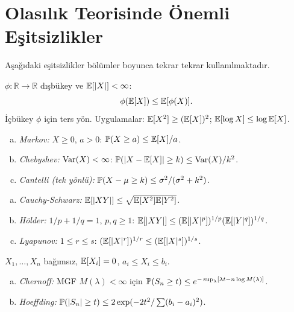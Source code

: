\section{Olasılık Teorisinde Önemli Eşitsizlikler}
\label{app:esitsizlikler}

Aşağıdaki eşitsizlikler bölümler boyunca tekrar tekrar kullanılmaktadır.

\begin{teorem}\label{app:thm:jensen}
$\phi:\mathbb{R}\to\mathbb{R}$ dışbükey ve $\mathbb{E}[|X|]<\infty$:
\[
  \phi(\mathbb{E}[X]) \leq \mathbb{E}[\phi(X)].
\]
İçbükey $\phi$ için ters yön.
Uygulamalar: $\mathbb{E}[X^2]\geq(\mathbb{E}[X])^2$; $\mathbb{E}[\log X]\leq\log\mathbb{E}[X]$.
\end{teorem}

\begin{teorem}\label{app:thm:markov_cheby}
\begin{enumerate}[(a)]
  \item \emph{Markov:} $X\geq0$, $a>0$: $\mathbb{P}(X\geq a)\leq\mathbb{E}[X]/a$.
  \item \emph{Chebyshev:} $\operatorname{Var}(X)<\infty$: $\mathbb{P}(|X-\mathbb{E}[X]|\geq k)\leq\operatorname{Var}(X)/k^2$.
  \item \emph{Cantelli (tek yönlü):} $\mathbb{P}(X-\mu\geq k)\leq\sigma^2/(\sigma^2+k^2)$.
\end{enumerate}
\end{teorem}

\begin{teorem}\label{app:thm:cs_holder}
\begin{enumerate}[(a)]
  \item \emph{Cauchy-Schwarz:} $\mathbb{E}[|XY|]\leq\sqrt{\mathbb{E}[X^2]\mathbb{E}[Y^2]}$.
  \item \emph{Hölder:} $1/p+1/q=1$, $p,q\geq1$: $\mathbb{E}[|XY|]\leq(\mathbb{E}[|X|^p])^{1/p}(\mathbb{E}[|Y|^q])^{1/q}$.
  \item \emph{Lyapunov:} $1\leq r\leq s$: $(\mathbb{E}[|X|^r])^{1/r}\leq(\mathbb{E}[|X|^s])^{1/s}$.
\end{enumerate}
\end{teorem}

\begin{teorem}\label{app:thm:chernoff_hoeff}
$X_1,\ldots,X_n$ bağımsız, $\mathbb{E}[X_i]=0$, $a_i\leq X_i\leq b_i$.
\begin{enumerate}[(a)]
  \item \emph{Chernoff:} MGF $M(\lambda)<\infty$ için $\mathbb{P}(S_n\geq t)\leq e^{-\sup_\lambda[\lambda t-n\log M(\lambda)]}$.
  \item \emph{Hoeffding:} $\mathbb{P}(|S_n|\geq t)\leq2\exp(-2t^2/\sum(b_i-a_i)^2)$.
\end{enumerate}
\end{teorem}

